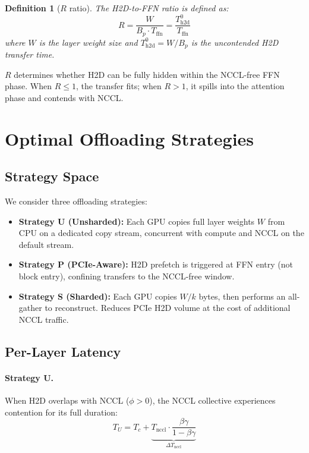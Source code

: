 \documentclass{article}
\newtheorem{definition}{Definition}
\begin{document}
\begin{definition}[$R$ ratio]
The \emph{H2D-to-FFN ratio} is defined as:
\begin{equation}
    R = \frac{W}{B_p \cdot T_{\text{ffn}}} = \frac{T_{\text{h2d}}^0}{T_{\text{ffn}}}
    \label{eq:R}
\end{equation}
where $W$ is the layer weight size and $T_{\text{h2d}}^0 = W/B_p$ is the uncontended H2D transfer time.
\end{definition}

$R$ determines whether H2D can be fully hidden within the NCCL-free FFN phase. When $R \leq 1$, the transfer fits; when $R > 1$, it spills into the attention phase and contends with NCCL.

\section{Optimal Offloading Strategies}
\label{sec:strategies}

\subsection{Strategy Space}

We consider three offloading strategies:
\begin{itemize}
    \item \textbf{Strategy U (Unsharded):} Each GPU copies full layer weights $W$ from CPU on a dedicated copy stream, concurrent with compute and NCCL on the default stream.
    \item \textbf{Strategy P (PCIe-Aware):} H2D prefetch is triggered at FFN entry (not block entry), confining transfers to the NCCL-free window.
    \item \textbf{Strategy S (Sharded):} Each GPU copies $W/k$ bytes, then performs an all-gather to reconstruct. Reduces PCIe H2D volume at the cost of additional NCCL traffic.
\end{itemize}

\subsection{Per-Layer Latency}

\paragraph{Strategy U.} When H2D overlaps with NCCL ($\phi > 0$), the NCCL collective experiences contention for its full duration:
\begin{equation}
    T_U = T_c + \underbrace{T_{\text{nccl}} \cdot \frac{\beta\gamma}{1-\beta\gamma}}_{\Delta T_{\text{nccl}}}
    \label{eq:TU}
\end{equation}
\end{document}

